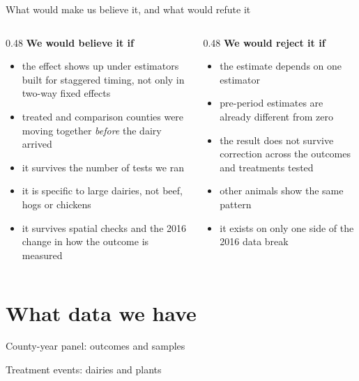 \documentclass[aspectratio=169]{beamer}
\begin{document}
\begin{frame}{What would make us believe it, and what would refute it}
\begin{columns}[T]
\begin{column}{0.48\textwidth}
\textbf{We would believe it if}
\begin{itemize}\footnotesize\setlength\itemsep{2pt}
  \item the effect shows up under estimators built for staggered timing, not only in two-way fixed effects
  \item treated and comparison counties were moving together \emph{before} the dairy arrived
  \item it survives the number of tests we ran
  \item it is specific to large dairies, not beef, hogs or chickens
  \item it survives spatial checks and the 2016 change in how the outcome is measured
\end{itemize}
\end{column}
\begin{column}{0.48\textwidth}
\textbf{We would reject it if}
\begin{itemize}\footnotesize\setlength\itemsep{2pt}
  \item the estimate depends on one estimator
  \item pre-period estimates are already different from zero
  \item the result does not survive correction across the outcomes and treatments tested
  \item other animals show the same pattern
  \item it exists on only one side of the 2016 data break
\end{itemize}
\end{column}
\end{columns}
\end{frame}

\section{What data we have}

\begin{frame}{County-year panel: outcomes and samples}

\end{frame}

\begin{frame}{Treatment events: dairies and plants}

\end{frame}
\end{document}
